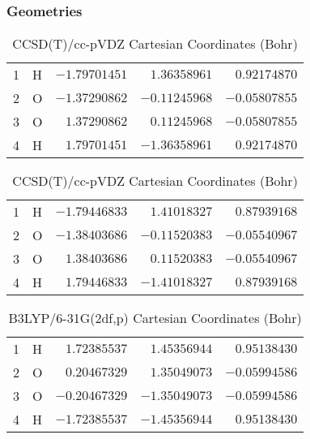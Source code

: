 \documentclass[10pt,oneside]{article}
\begin{document}
\clearpage

\subsection{}

\begin{table}[h!]
\subsubsection*{Geometries}
\begin{multicols}{2}
\centering
\caption{CCSD(T)/cc-pVTZ Cartesian Coordinates (Bohr)}
\begin{tabular}{llrrr}
\toprule
1  & H  & $-1.79701451$ & $ 1.36358961$ & $ 0.92174870$ \\
2  & O  & $-1.37290862$ & $-0.11245968$ & $-0.05807855$ \\
3  & O  & $ 1.37290862$ & $ 0.11245968$ & $-0.05807855$ \\
4  & H  & $ 1.79701451$ & $-1.36358961$ & $ 0.92174870$ \\
\bottomrule
\end{tabular}
\caption{CCSD(T)/cc-pVDZ Cartesian Coordinates (Bohr)}
\begin{tabular}{llrrr}
\toprule
1  & H  & $-1.79446833$ & $ 1.41018327$ & $ 0.87939168$ \\
2  & O  & $-1.38403686$ & $-0.11520383$ & $-0.05540967$ \\
3  & O  & $ 1.38403686$ & $ 0.11520383$ & $-0.05540967$ \\
4  & H  & $ 1.79446833$ & $-1.41018327$ & $ 0.87939168$ \\
\bottomrule
\end{tabular}
\end{multicols}
\end{table}

\begin{table}[h]
\centering
\caption{B3LYP/6-31G(2df,p) Cartesian Coordinates (Bohr)}
\begin{tabular}{llrrr}
\toprule
1  & H  & $ 1.72385537$ & $ 1.45356944$ & $ 0.95138430$ \\
2  & O  & $ 0.20467329$ & $ 1.35049073$ & $-0.05994586$ \\
3  & O  & $-0.20467329$ & $-1.35049073$ & $-0.05994586$ \\
4  & H  & $-1.72385537$ & $-1.45356944$ & $ 0.95138430$ \\
\bottomrule
\end{tabular}
\end{table}
\end{document}
